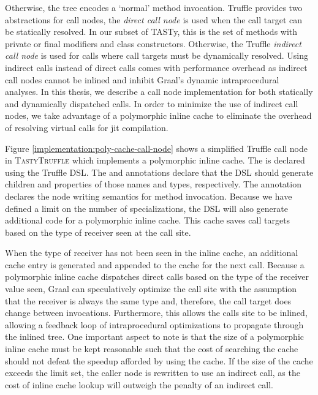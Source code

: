 Otherwise, the  tree encodes a `normal' method invocation.
Truffle provides two abstractions for call nodes, the \textit{direct call node} is used when the call target can be statically resolved. 
In our subset of TASTy, this is the set of methods with private or final modifiers\cite{java:lang-spec} and class constructors. 
Otherwise, the Truffle \textit{indirect call node} is used for calls where call targets must be dynamically resolved. 
Using indirect calls instead of direct calls comes with performance overhead as indirect call nodes cannot be inlined and inhibit Graal's dynamic intraprocedural analyses.
In this thesis, we describe a call node implementation for both statically and dynamically dispatched calls. 
In order to minimize the use of indirect call nodes, we take advantage of a polymorphic inline cache\cite{self:polymorphic-inline-caches} to eliminate the overhead of resolving virtual calls for \acrshort{jit} compilation. 

Figure \ref{implementation:poly-cache-call-node} shows a simplified Truffle call node in \textsc{TastyTruffle} which implements a polymorphic inline cache.
The  is declared using the Truffle DSL.
The  and  annotations declare that the DSL should generate children and properties of those names and types, respectively. 
The  annotation declares the node writing semantics for method invocation.
Because we have defined a limit on the number of specializations, the DSL will also generate additional code for a polymorphic inline cache.
This cache saves call targets based on the type of receiver seen at the call site. 

When the type of receiver has not been seen in the inline cache, an additional cache entry is generated and appended to the cache for the next call.
Because a polymorphic inline cache dispatches direct calls based on the type of the receiver value seen, Graal can speculatively optimize the call site with the assumption that the receiver is always the same type and, therefore, the call target does change between invocations.
Furthermore, this allows the calls site to be inlined, allowing a feedback loop of intraprocedural optimizations\cite{conditional-constant-prop}\cite{variable-congruence} to propagate through the inlined tree.
One important aspect to note is that the size of a polymorphic inline cache must be kept reasonable such that the cost of searching the cache should not defeat the speedup afforded by using the cache.
If the size of the cache exceeds the limit set, the caller node is rewritten to use an indirect call, as the cost of inline cache lookup will outweigh the penalty of an indirect call. 

